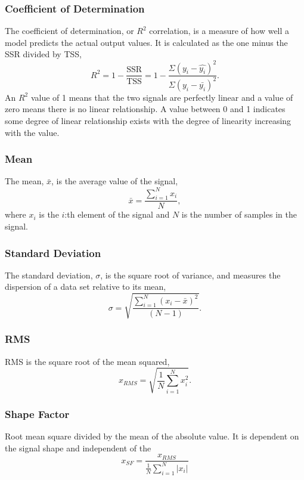 \documentclass[]{article}
\begin{document}
\subsubsection*{Coefficient of Determination}
The coefficient of determination, or $R^{2}$ correlation, is a measure of how well a model predicts the actual output values. It is calculated as the one minus the \gls{SSR} divided by \gls{TSS},
\begin{equation}
R^{2} = 1 - \frac{\textrm{SSR}}{\textrm{TSS}} = 1 - \frac{\Sigma(y_i - \hat{y_i})^2}{\Sigma(y_i - \bar{y_i})^2}. 
\end{equation}
An $R^{2}$ value of 1 means that the two signals are perfectly linear and a value of zero means there is no linear relationship. A value between 0 and 1 indicates some degree of linear relationship exists with the degree of linearity increasing with the value.
\subsubsection*{Mean}
The mean, $ \bar{x} $, is the average value of the signal,
\begin{equation}
\bar{x} = \frac{\sum^N_{i=1} x_i}{N},
\end{equation}
where $ x_i $ is the $ i $:th element of the signal and $ N $ is the number of samples in the signal.
\subsubsection*{Standard Deviation}  
The standard deviation, $\sigma$, is the square root of variance, and measures the dispersion of a data set relative to its mean,
\begin{equation}
	\sigma =\sqrt{\frac{\sum^N_{i=1}(x_i-\bar{x})^2}{(N-1)}}.
\end{equation}
\subsubsection*{\gls{RMS}}
\gls{RMS} is the square root of the mean squared,
\begin{equation}
x_{RMS} = \sqrt{\frac{1}{N} \sum^N_{i=1}x^2_i}.
\end{equation}
\subsubsection*{Shape Factor}
Root mean square divided by the mean of the absolute value. It is dependent on the signal shape and independent of the 
\begin{equation}
x_{SF} = \frac{ x_{RMS} }  {\frac{1}{N}\sum^N_{i=1}|x_i|}
\end{equation}
\end{document}

